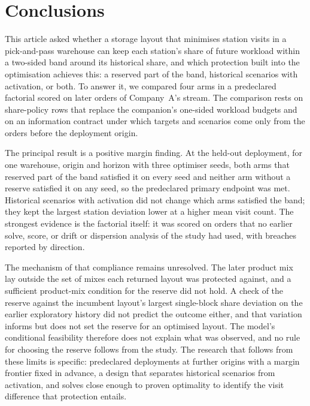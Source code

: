 \section{Conclusions}\label{sec:conclusion}
This article asked whether a storage layout that minimises station visits in a pick-and-pass warehouse can keep each station's share of future workload within a two-sided band around its historical share, and which protection built into the optimisation achieves this: a reserved part of the band, historical scenarios with activation, or both. To answer it, we compared four arms in a predeclared factorial scored on later orders of Company~A's stream. The comparison rests on share-policy rows that replace the companion's one-sided workload budgets and on an information contract under which targets and scenarios come only from the orders before the deployment origin.

The principal result is a positive margin finding. At the held-out deployment, for one warehouse, origin and horizon with three optimiser seeds, both arms that reserved part of the band satisfied it on every seed and neither arm without a reserve satisfied it on any seed, so the predeclared primary endpoint was met. Historical scenarios with activation did not change which arms satisfied the band; they kept the largest station deviation lower at a higher mean visit count. The strongest evidence is the factorial itself: it was scored on orders that no earlier solve, score, or drift or dispersion analysis of the study had used, with breaches reported by direction.

The mechanism of that compliance remains unresolved. The later product mix lay outside the set of mixes each returned layout was protected against, and a sufficient product-mix condition for the reserve did not hold. A check of the reserve against the incumbent layout's largest single-block share deviation on the earlier exploratory history did not predict the outcome either, and that variation informs but does not set the reserve for an optimised layout. The model's conditional feasibility therefore does not explain what was observed, and no rule for choosing the reserve follows from the study. The research that follows from these limits is specific: predeclared deployments at further origins with a margin frontier fixed in advance, a design that separates historical scenarios from activation, and solves close enough to proven optimality to identify the visit difference that protection entails.

